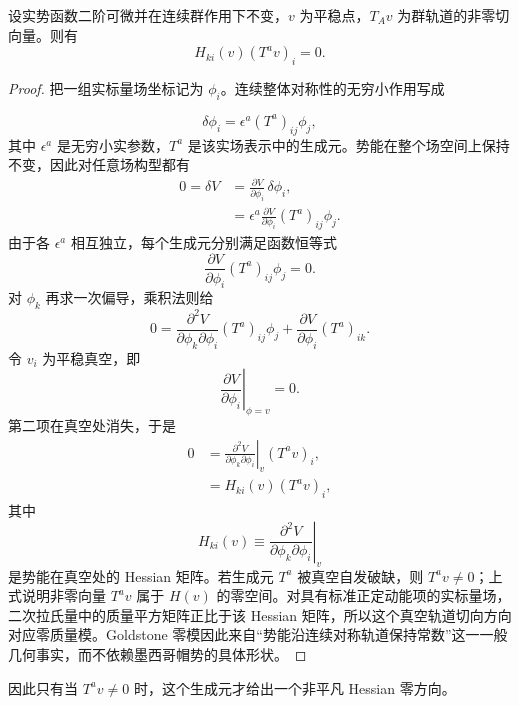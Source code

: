 \begin{proposition}
设实势函数二阶可微并在连续群作用下不变，$v$ 为平稳点，$T_Av$ 为群轨道的非零切向量。则有
\begin{equation}
{
H_{ki}(v)(T^av)_i=0.}
\label{eq:ssb-general-hessian-zero-mode-dp68}
\end{equation}
\end{proposition}
\begin{proof}
把一组实标量场坐标记为 $\phi_i$。连续整体对称性的无穷小作用写成

\begin{equation*}
 \delta\phi_i=\epsilon^a(T^a)_{ij}\phi_j,
\end{equation*}
其中 $\epsilon^a$ 是无穷小实参数，$T^a$ 是该实场表示中的生成元。势能在整个场空间上保持不变，因此对任意场构型都有
\begin{align*}
 0=\delta V
 &=\frac{\partial V}{\partial\phi_i}\,\delta\phi_i,\\
 &=\epsilon^a\frac{\partial V}{\partial\phi_i}(T^a)_{ij}\phi_j.
\end{align*}
由于各 $\epsilon^a$ 相互独立，每个生成元分别满足函数恒等式
\begin{equation*}
 \frac{\partial V}{\partial\phi_i}(T^a)_{ij}\phi_j=0.
\end{equation*}
对 $\phi_k$ 再求一次偏导，乘积法则给
\begin{equation*}
 0=
 \frac{\partial^2V}{\partial\phi_k\partial\phi_i}
 (T^a)_{ij}\phi_j
 +\frac{\partial V}{\partial\phi_i}(T^a)_{ik}.
\end{equation*}
令 $v_i$ 为平稳真空，即
\begin{equation*}
 \left.\frac{\partial V}{\partial\phi_i}\right|_{\phi=v}=0.
\end{equation*}
第二项在真空处消失，于是
\begin{align*}
 0
 &=\left.\frac{\partial^2V}{\partial\phi_k\partial\phi_i}
 \right|_{v}(T^av)_i,\\
 &=H_{ki}(v)(T^av)_i,
\end{align*}
其中
\begin{equation*}
 H_{ki}(v)\equiv
 \left.\frac{\partial^2V}{\partial\phi_k\partial\phi_i}\right|_v
\end{equation*}
是势能在真空处的 Hessian 矩阵。若生成元 $T^a$ 被真空自发破缺，则 $T^av\neq0$；上式说明非零向量 $T^av$ 属于 $H(v)$ 的零空间。对具有标准正定动能项的实标量场，二次拉氏量中的质量平方矩阵正比于该 Hessian 矩阵，所以这个真空轨道切向方向对应零质量模。Goldstone 零模因此来自“势能沿连续对称轨道保持常数”这一一般几何事实，而不依赖墨西哥帽势的具体形状。
\end{proof}

因此只有当 \(T^av\neq0\) 时，这个生成元才给出一个非平凡 Hessian 零方向。



